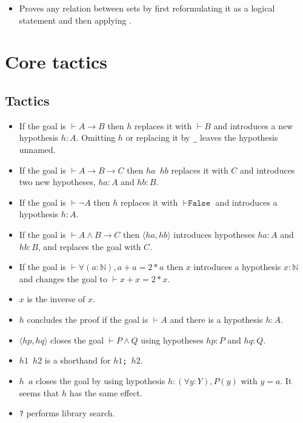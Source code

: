\documentclass[a4paper]{article}
\newcommand{\False}{\texttt{False}}
\newcommand{\N}{\mathbb{N}}
\begin{document}

\begin{itemize}
    \item Proves any relation between sets by first reformulating it as a logical statement and then applying \tauto.
\end{itemize}

\section{Core tactics}

\subsection*{Tactics}


\begin{itemize}
    \item If the goal is $\vdash A \to B$ then \texttt{\intro $h$} replaces it with $\vdash B$ and introduces a new hypothesis $h:A$. Omitting $h$ or replacing it by \verb|_| leaves the hypothesis unnamed.
    \item If the goal is $\vdash A \to B \to C$ then \texttt{\intro $ha$ $hb$} replaces it with $C$ and introduces two new hypotheses, $ha:A$ and $hb:B$.
    \item If the goal is $\vdash \neg A$ then \texttt{\intro $h$} replaces it with $\vdash \False$ and introduces a hypothesis $h:A$.
    \item If the goal is $\vdash A \wedge B \to C$ then \texttt{\intro $\langle ha, hb \rangle$} introduces hypotheses $ha:A$ and $hb:B$, and replaces the goal with $C$.
    \item If the goal is $\vdash \forall (a:\N), a + a = 2 * a$ then \texttt{\intro $x$} introduces a hypothesis $x:\N$ and changes the goal to $\vdash x+x = 2*x$.
\end{itemize}


\begin{itemize}
    \item \texttt{\revert $x$} is the inverse of \texttt{\intro $x$}.
\end{itemize}


\begin{itemize}
    \item \texttt{\exact $h$} concludes the proof if the goal is $\vdash A$ and there is a hypothesis $h:A$.
    \item \texttt{\exact $\langle hp, hq \rangle$} closes the goal $\vdash P \wedge Q$ using hypotheses $hp:P$ and $hq:Q$.
    \item \texttt{\exact $h1$ $h2$} is a shorthand for \texttt{\apply $h1$; \exact $h2$}.
    \item \texttt{\exact $h$ $a$} closes the goal by using hypothesis $h : (\forall y : Y), P(y)$ with $y = a$.
    It seems that \texttt{\apply $h$} has the same effect.
    \item \texttt{\exact?} performs library search.
\end{itemize}
\end{document}
